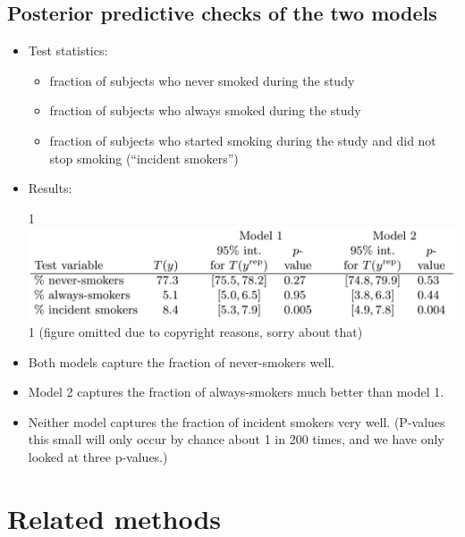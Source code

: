 \documentclass[12pt]{article}
\newcommand{\blind}{1}
\begin{document}
\subsection*{Posterior predictive checks of the two models}
\begin{itemize}
\item Test statistics:
\begin{itemize}
\item fraction of subjects who never smoked during the study
\item fraction of subjects who always smoked during the study
\item fraction of subjects who started smoking during the study and did not stop smoking (``incident smokers'')
\end{itemize}
\item Results:
\begin{center}
\blind {
\includegraphics[width=1\textwidth]{smoking-results.png}
} \fi
{}\blind { (figure omitted due to copyright reasons, sorry about that) } \fi
\end{center}
\item Both models capture the fraction of never-smokers well.
\item Model 2 captures the fraction of always-smokers much better than model 1.
\item Neither model captures the fraction of incident smokers very well. (P-values this small will only occur by chance about 1 in 200 times, and we have only looked at three p-values.)
\end{itemize}


\section{Related methods}
\end{document}
